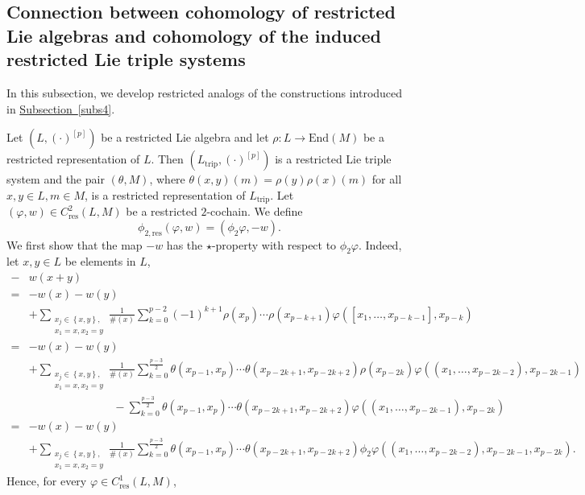 \documentclass[11pt, twoside]{article}
\begin{document}
\subsection{Connection between cohomology of  restricted Lie algebras and  cohomology of the induced restricted Lie triple systems}

In this subsection, we develop restricted analogs of the constructions introduced in \hyperref[subs4]{Subsection~\ref*{subs4}}. 

Let $(L,(\cdot)^{[p]}) $ be a restricted Lie algebra and let $\rho:L\to \mathrm{End}(M)$ be a restricted representation of $L$. Then $(L_\mathrm{trip},(\cdot)^{[p]}) $ is a restricted Lie triple system and the pair $(\theta,M) $, where $\theta(x,y)(m)=\rho(y)\rho(x)(m) $ for all $x,y\in L,m\in M$, is a restricted representation of $L_\mathrm{trip} $. Let $(\varphi,w)\in C^2_\mathrm{res}(L,M) $ be a restricted $2$-cochain. We define $$\phi_{2,\mathrm{res}}(\varphi,w)=(\phi_2\varphi,-w). $$ We first show that the map $-w $ has the $\star$-property with respect to $\phi_2\varphi$. Indeed, let $x,y\in L$ be elements in $L$, \begin{align*}
    -&w(x+y)\\=& -w(x)-w(y) \\ & + \sum_{\substack{x_j\in \left\{x,y \right\},\\x_1=x,x_2=y}}\frac{1}{\#(x)}\sum\limits_{k=0}^{p-2}(-1)^{k+1}\rho(x_p)\cdots \rho(x_{p-k+1})\varphi([x_1,\ldots,x_{p-k-1}],x_{p-k})\\ =& -w(x)-w(y) \\ &+ \sum_{\substack{x_j\in \left\{x,y \right\},\\x_1=x,x_2=y}}\frac{1}{\#(x)} \sum\limits_{k=0}^{\frac{p-3}{2}}\theta(x_{p-1},x_p)\cdots\theta(x_{p-2k+1},x_{p-2k+2}) \rho(x_{p-2k})\varphi((x_1,\ldots,x_{p-2k-2}),x_{p-2k-1})  \\& \,\,\,\,\,\,\,\,\,\,\,\,\,\,\,\,\,\,\,\,\,\,\,\,\,\,\,\,\,\,\,\,\,\,\,\,\,\,\,\,\,\,\,\,\,-\sum\limits_{k=0}^{\frac{p-
    3}{2}}\theta(x_{p-1},x_p)\cdots\theta(x_{p-2k+1},x_{p-2k+2})\varphi((x_1,\ldots,x_{p-2k-1}),x_{p-2k}) \\ =& -w(x) -w(y) \\&+ \sum_{\substack{x_j\in \left\{x,y \right\},\\x_1=x,x_2=y}}\frac{1}{\#(x)} \sum\limits_{k=0}^{\frac{p-3}{2}}\theta(x_{p-1},x_p)\cdots\theta(x_{p-2k+1},x_{p-2k+2}) \phi_2\varphi((x_1,\ldots,x_{p-2k-2}),x_{p-2k-1},x_{p-2k}).
\end{align*} Hence, for every $\varphi\in C^1_\mathrm{res}(L,M)$, \begin{equation}

\end{equation}
\end{document}
